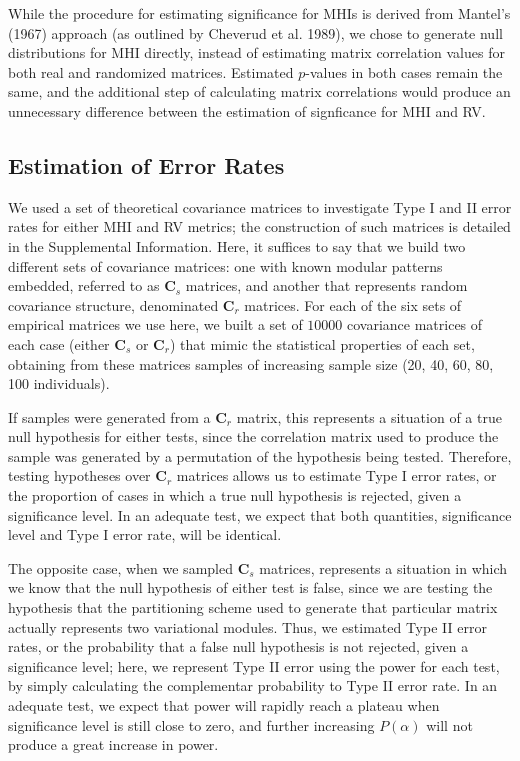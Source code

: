 \documentclass[12pt,]{article}
\begin{document}
While the procedure for estimating significance for MHIs is derived from
Mantel's (1967) approach (as outlined by Cheverud et al. 1989), we chose
to generate null distributions for MHI directly, instead of estimating
matrix correlation values for both real and randomized matrices.
Estimated $p$-values in both cases remain the same, and the additional
step of calculating matrix correlations would produce an unnecessary
difference between the estimation of signficance for MHI and RV.

\subsection{Estimation of Error Rates}\label{estimation-of-error-rates}

We used a set of theoretical covariance matrices to investigate Type I
and II error rates for either MHI and RV metrics; the construction of
such matrices is detailed in the Supplemental Information. Here, it
suffices to say that we build two different sets of covariance matrices:
one with known modular patterns embedded, referred to as $\mathbf{C}_s$
matrices, and another that represents random covariance structure,
denominated $\mathbf{C}_r$ matrices. For each of the six sets of
empirical matrices we use here, we built a set of $10000$ covariance
matrices of each case (either $\mathbf{C}_s$ or $\mathbf{C}_r$) that
mimic the statistical properties of each set, obtaining from these
matrices samples of increasing sample size (20, 40, 60, 80, 100
individuals).

If samples were generated from a $\mathbf{C}_r$ matrix, this represents
a situation of a true null hypothesis for either tests, since the
correlation matrix used to produce the sample was generated by a
permutation of the hypothesis being tested. Therefore, testing
hypotheses over $\mathbf{C}_r$ matrices allows us to estimate Type I
error rates, or the proportion of cases in which a true null hypothesis
is rejected, given a significance level. In an adequate test, we expect
that both quantities, significance level and Type I error rate, will be
identical.

The opposite case, when we sampled $\mathbf{C}_s$ matrices, represents a
situation in which we know that the null hypothesis of either test is
false, since we are testing the hypothesis that the partitioning scheme
used to generate that particular matrix actually represents two
variational modules. Thus, we estimated Type II error rates, or the
probability that a false null hypothesis is not rejected, given a
significance level; here, we represent Type II error using the power for
each test, by simply calculating the complementar probability to Type II
error rate. In an adequate test, we expect that power will rapidly reach
a plateau when significance level is still close to zero, and further
increasing $P(\alpha)$ will not produce a great increase in power.
\end{document}
